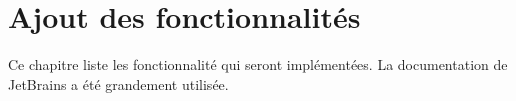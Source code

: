 \chapter{Ajout des fonctionnalités}
\noindent Ce chapitre liste les fonctionnalité qui seront implémentées. 
\newdoubleline La documentation de JetBrains a été grandement utilisée\cite{pluginDoc}.






